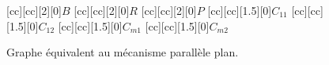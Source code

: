 \begin{figure}[t]
\centering
{}[cc][cc][2][0]{$B$}
[cc][cc][2][0]{$R$}
[cc][cc][2][0]{$P$}
[cc][cc][1.5][0]{$C_{11}$}
[cc][cc][1.5][0]{$C_{12}$}
[cc][cc][1.5][0]{$C_{m1}$}
[cc][cc][1.5][0]{$C_{m2}$}
\caption{\label{fig:chap1:graphe_bon}Graphe équivalent au mécanisme parallèle plan.}
\end{figure}
